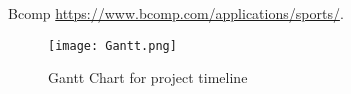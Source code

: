 \documentclass[9pt,twocolumn,twoside]{article}
\begin{document}

\begin{thebibliography}{9}

 Bcomp \url{https://www.bcomp.com/applications/sports/}.



\end{thebibliography}

\begin{figure*}[h!]
    \centering
    \texttt{[image: Gantt.png]} 
    \caption{Gantt Chart for project timeline}
    \label{fig:Gantt}
\end{figure*}

\clearpage


\end{document}
